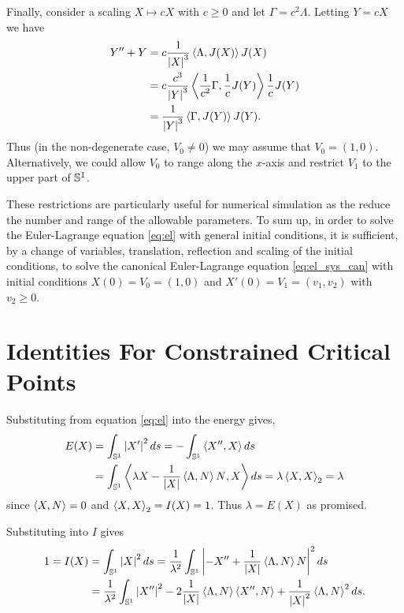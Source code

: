 \documentclass[12pt]{article}
\begin{document}
Finally, consider a scaling \(X \mapsto cX\) with \(c \geq 0\) and let \(\Gamma = c^2 \Lambda\). Letting \(Y = cX\) we have
\[
\begin{split}
Y'' + Y &= c \frac{1}{\left|{X}\right|^3} \left\langle{\Lambda},{J(X)}\right\rangle J(X) \\
&= c \frac{c^3}{\left|{Y}\right|^3} \left\langle{\frac{1}{c^2} \Gamma},{\frac{1}{c} J(Y)}\right\rangle \frac{1}{c} J(Y) \\
&= \frac{1}{\left|{Y}\right|^3} \left\langle{\Gamma},{J(Y)}\right\rangle J(Y).
\end{split}
\]
Thus (in the non-degenerate case, \(V_0 \ne 0\)) we may assume that \(V_0 = (1, 0)\). Alternatively, we could allow \(V_0\) to range along the \(x\)-axis and restrict \(V_1\) to the upper part of \(\operatorname{\mathbb{S}^1}\).

These restrictions are particularly useful for numerical simulation as the reduce the number and range of the allowable parameters. To sum up, in order to solve the Euler-Lagrange equation \eqref{eq:el} with general initial conditions, it is sufficient, by a change of variables, translation, reflection and scaling of the initial conditions, to solve the canonical Euler-Lagrange equation \eqref{eq:el_sys_can} with initial conditions \(X(0) = V_0 = (1, 0)\) and \(X'(0) = V_1 = (v_1, v_2)\) with \(v_2 \geq 0\).

\section{Identities For Constrained Critical Points}

Substituting from equation \eqref{eq:el} into the energy gives,
\begin{equation}
\label{eq:Ecrit}
\begin{split}
E(X) &= \int_{\operatorname{\mathbb{S}^1}} \left|{X'}\right|^2 ds = -\int_{\operatorname{\mathbb{S}^1}} \left\langle{X''},{X}\right\rangle ds \\
&= \int_{\operatorname{\mathbb{S}^1}} \left\langle{\lambda X - \frac{1}{\left|{X}\right|} \ensuremath{\left\langle{\Lambda},{N}\right\rangle}N},{X}\right\rangle ds = \lambda \left\langle{X},{X}\right\rangle_2 = \lambda
\end{split}
\end{equation}
since \(\left\langle{X},{N}\right\rangle = 0\) and \(\left\langle{X},{X}\right\rangle_2 = I(X) = 1\). Thus \(\lambda = E(X)\) as promised.

Substituting into \(I\) gives
\begin{equation}
\label{eq:Icrit}
\begin{split}
1 = I(X) &= \int_{\operatorname{\mathbb{S}^1}} \left|{X}\right|^2 ds = \frac{1}{\lambda^2} \int_{\operatorname{\mathbb{S}^1}} \left|{-X'' +  \frac{1}{\left|{X}\right|} \left\langle{\Lambda},{N}\right\rangle N}\right|^2 ds \\
&= \frac{1}{\lambda^2} \int_{\operatorname{\mathbb{S}^1}} \left|{X''}\right|^2 - 2\frac{1}{\left|{X}\right|} \left\langle{\Lambda},{N}\right\rangle\left\langle{X''},{N}\right\rangle + \frac{1}{\left|{X}\right|^2} \left\langle{\Lambda},{N}\right\rangle^2 ds.
\end{split}
\end{equation}
\end{document}

